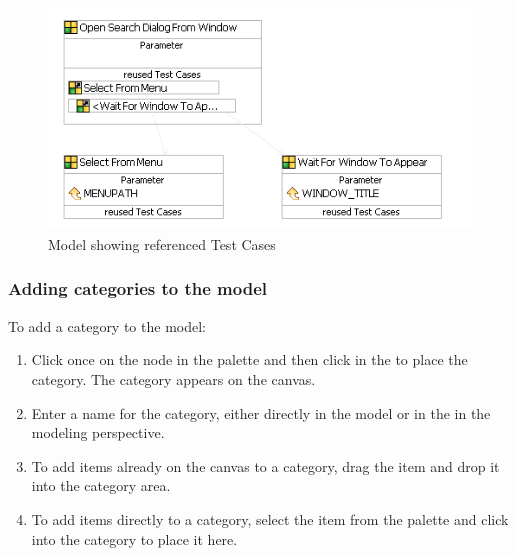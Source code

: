 \begin{figure}[h]
\begin{center}
\includegraphics{Tasks/Modelling/PS/Model_ReusedTCs}
\caption{Model showing referenced Test Cases}
\label{ModelReusedTCs}
\end{center}
\end{figure} 

\subsubsection{Adding categories to the model}
To add a category to the model:
\begin{enumerate}
\item Click once on the  node in the palette and then click in the \gdmodeleditor{} to place the category. The category appears on the canvas. 
\item Enter a name for the  category, either directly in the model or in the \gdpropview{} in the modeling perspective.  
\item To add items already on the canvas to a category, drag the item and drop it into the category area. 
\item To add items directly to a category, select the item from the palette and click into the category to place it here. 
\end{enumerate}
